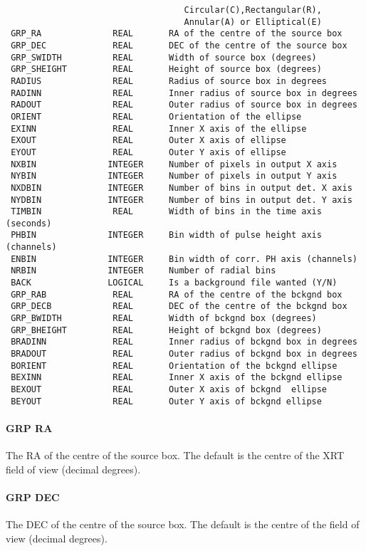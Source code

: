 \documentclass{book}
\renewcommand{\_}{{\tt\char'137}}     %
\begin{document}
\begin{verbatim}
                                   Circular(C),Rectangular(R),
                                   Annular(A) or Elliptical(E)
 GRP_RA              REAL       RA of the centre of the source box
 GRP_DEC             REAL       DEC of the centre of the source box
 GRP_SWIDTH          REAL       Width of source box (degrees)
 GRP_SHEIGHT         REAL       Height of source box (degrees)
 RADIUS              REAL       Radius of source box in degrees
 RADINN              REAL       Inner radius of source box in degrees
 RADOUT              REAL       Outer radius of source box in degrees
 ORIENT              REAL       Orientation of the ellipse
 EXINN               REAL       Inner X axis of the ellipse
 EXOUT               REAL       Outer X axis of ellipse
 EYOUT               REAL       Outer Y axis of ellipse
 NXBIN              INTEGER     Number of pixels in output X axis
 NYBIN              INTEGER     Number of pixels in output Y axis
 NXDBIN             INTEGER     Number of bins in output det. X axis
 NYDBIN             INTEGER     Number of bins in output det. Y axis
 TIMBIN              REAL       Width of bins in the time axis (seconds)
 PHBIN              INTEGER     Bin width of pulse height axis (channels)
 ENBIN              INTEGER     Bin width of corr. PH axis (channels)
 NRBIN              INTEGER     Number of radial bins
 BACK               LOGICAL     Is a background file wanted (Y/N)
 GRP_RAB             REAL       RA of the centre of the bckgnd box
 GRP_DECB            REAL       DEC of the centre of the bckgnd box
 GRP_BWIDTH          REAL       Width of bckgnd box (degrees)
 GRP_BHEIGHT         REAL       Height of bckgnd box (degrees)
 BRADINN             REAL       Inner radius of bckgnd box in degrees
 BRADOUT             REAL       Outer radius of bckgnd box in degrees
 BORIENT             REAL       Orientation of the bckgnd ellipse
 BEXINN              REAL       Inner X axis of the bckgnd ellipse
 BEXOUT              REAL       Outer X axis of bckgnd  ellipse
 BEYOUT              REAL       Outer Y axis of bckgnd ellipse

\end{verbatim}\paragraph{GRP RA}
The RA of the centre of the source box. The default is the centre
of the XRT field of view (decimal degrees).

\paragraph{GRP DEC}
The DEC of the centre of the source box. The default is the centre
of the field of view (decimal degrees).
\end{document}
